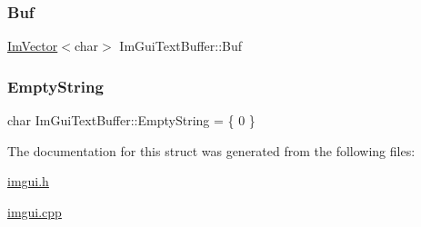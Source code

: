 \subsubsection{\texorpdfstring{Buf}{Buf}}
{\footnotesize\ttfamily \mbox{\hyperlink{class_im_vector}{Im\+Vector}}$<$char$>$ Im\+Gui\+Text\+Buffer\+::\+Buf}

\mbox{\label{struct_im_gui_text_buffer_a471f810a368ec5f4a8ee12c407330c35}} 
\subsubsection{\texorpdfstring{Empty\+String}{EmptyString}}
{\footnotesize\ttfamily char Im\+Gui\+Text\+Buffer\+::\+Empty\+String = \{ 0 \}\hspace{0.3cm}{\ttfamily [static]}}



The documentation for this struct was generated from the following files\+:\begin{DoxyCompactItemize}
\item 
\mbox{\hyperlink{imgui_8h}{imgui.\+h}}\item 
\mbox{\hyperlink{imgui_8cpp}{imgui.\+cpp}}\end{DoxyCompactItemize}

